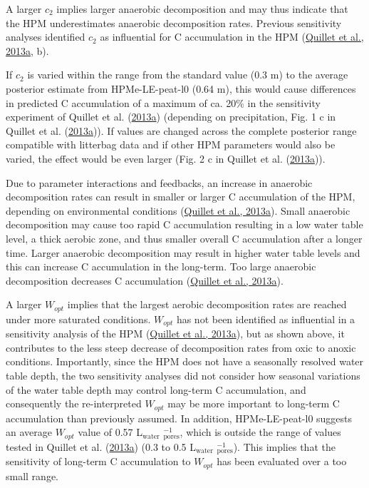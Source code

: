 \documentclass[
  12pt,
]{article}
\begin{document}
A larger \(c_2\) implies larger anaerobic decomposition and may thus indicate that the HPM underestimates anaerobic decomposition rates. Previous sensitivity analyses identified \(c_2\) as influential for C accumulation in the HPM (\protect\hyperlink{ref-Quillet.2013}{Quillet et al., 2013a}, b).

If \(c_2\) is varied within the range from the standard value (0.3 m) to the average posterior estimate from HPMe-LE-peat-l0 (0.64 m), this would cause differences in predicted C accumulation of a maximum of ca. 20\% in the sensitivity experiment of Quillet et al. (\protect\hyperlink{ref-Quillet.2013}{2013a}) (depending on precipitation, Fig. 1 c in Quillet et al. (\protect\hyperlink{ref-Quillet.2013}{2013a})). If values are changed across the complete posterior range compatible with litterbag data and if other HPM parameters would also be varied, the effect would be even larger (Fig. 2 c in Quillet et al. (\protect\hyperlink{ref-Quillet.2013}{2013a})).

Due to parameter interactions and feedbacks, an increase in anaerobic decomposition rates can result in smaller or larger C accumulation of the HPM, depending on environmental conditions (\protect\hyperlink{ref-Quillet.2013}{Quillet et al., 2013a}). Small anaerobic decomposition may cause too rapid C accumulation resulting in a low water table level, a thick aerobic zone, and thus smaller overall C accumulation after a longer time. Larger anaerobic decomposition may result in higher water table levels and this can increase C accumulation in the long-term. Too large anaerobic decomposition decreases C accumulation (\protect\hyperlink{ref-Quillet.2013}{Quillet et al., 2013a}).

A larger \(W_{opt}\) implies that the largest aerobic decomposition rates are reached under more saturated conditions. \(W_{opt}\) has not been identified as influential in a sensitivity analysis of the HPM (\protect\hyperlink{ref-Quillet.2013}{Quillet et al., 2013a}), but as shown above, it contributes to the less steep decrease of decomposition rates from oxic to anoxic conditions. Importantly, since the HPM does not have a seasonally resolved water table depth, the two sensitivity analyses did not consider how seasonal variations of the water table depth may control long-term C accumulation, and consequently the re-interpreted \(W_{opt}\) may be more important to long-term C accumulation than previously assumed. In addition, HPMe-LE-peat-l0 suggests an average \(W_{opt}\) value of 0.57 L\(_\text{water}\) \(_\text{pores}^{-1}\), which is outside the range of values tested in Quillet et al. (\protect\hyperlink{ref-Quillet.2013}{2013a}) (0.3 to 0.5 L\(_\text{water}\) \(_\text{pores}^{-1}\)). This implies that the sensitivity of long-term C accumulation to \(W_{opt}\) has been evaluated over a too small range.
\end{document}
